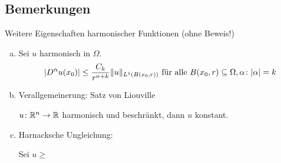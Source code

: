 \subsection{Bemerkungen}

Weitere Eigenschaften harmonischer Funktionen (ohne Beweis!)
\begin{enumerate}[a)]
  \item Sei $u$ harmonisch in $\Omega$.
    $$
    |D^\alpha u(x_0)| \leq \frac{C_k}{r^{n + k}} \lVert u \rVert_{L^1(B(x_0,r))} \text{ für alle } B(x_0, r) \subseteq \Omega, \alpha \colon |\alpha| = k
    $$
  \item Verallgemeinerung: Satz von Liouville

    $u \colon \mathbb{R}^n \to \mathbb{R}$ harmonisch und beschränkt, dann $u$ konstant.

    \item Harnacksche Ungleichung:

      Sei $u \geq $
\end{enumerate}



